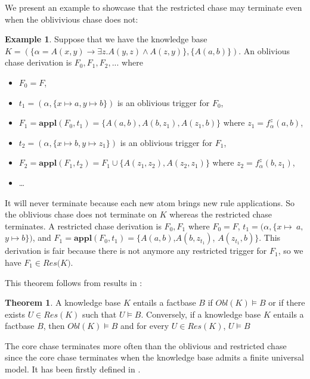 \documentclass{article}
\theoremstyle{definition}
\newtheorem{theorem}{Theorem}[section]
\newtheorem{example}{Example}[section]
\theoremstyle{remark}
\newcommand{\Appl}{\textbf{appl}}
\begin{document}
We present an example to showcase that the restricted chase may terminate even when the oblivivious chase does not:
\begin{example}
Suppose that we have the knowledge base $K=(\{\alpha  = A(x,y) \rightarrow \exists z.A(y,z) \wedge A(z,y)\},\{A(a,b)\})$. An oblivious chase derivation is $F_0,F_1,F_2,...$ where
\begin{itemize}
\item $F_0 = F$, 
\item $t_1=(\alpha,\{x \mapsto a, y \mapsto b\})$ is an oblivious trigger for $F_0$, 
\item $F_1= \Appl(F_0,t_1) =\{A(a,b),A(b,z_1),A(z_1,b)\}$ where $z_1 =f_\alpha^z(a,b)$,
\item $t_2=(\alpha,\{x \mapsto b, y \mapsto z_1\})$ is an oblivious trigger for $F_1$, 
\item $F_2= \Appl(F_1,t_2) =F_1 \cup \{ A(z_1,z_2), A(z_2,z_1)\}$ where $z_2= f_\alpha^z(b,z_1)$, 
\item \ldots\ 
\end{itemize} 
It will never terminate because each new atom brings new rule applications. So the oblivious chase does not terminate on $K$ whereas the restricted chase terminates. A restricted chase derivation is $F_0,F_1$ where $F_0 = F$, $t_1=(\alpha,\{x \mapsto~a,$ $y \mapsto b\})$, and $F_1= \Appl(F_0,t_1) =\{A(a,b)$,$A(b,z_{t_1})$, $A(z_{t_1},b)\}$. This derivation is fair because there is not anymore any restricted trigger for $F_1$, so we have $F_1 \in \textit{Res(K)}$.
\end{example}


This theorem follows from results in \cite{obl_res}:

\begin{theorem}
A knowledge base $K$ entails a factbase $B$ if $\textit{Obl}(K) \vDash B$ or if there exists $U \in \textit{Res}(K)$ such that $U \vDash B$. Conversely, if a knowledge base $K$ entails a factbase $B$, then $\textit{Obl}(K) \vDash B$ and for every $U \in \textit{Res}(K)$, $U \vDash B$
\end{theorem}


The core chase terminates more often than the oblivious and restricted chase since the core chase terminates when the knowledge base admits a finite universal model. It has been firstly defined in \cite{core_chase}.
\end{document}
